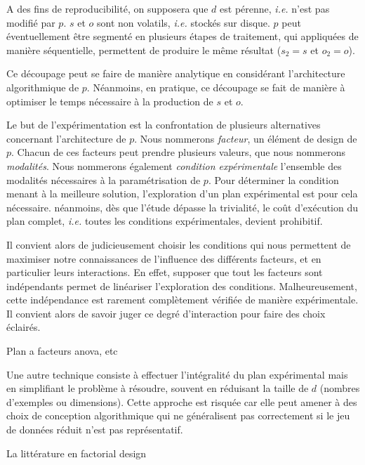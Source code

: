 A des fins de reproducibilité, on supposera que $d$ est pérenne, \textit{i.e.} n'est pas modifié par $p$. $s$ et $o$ sont non volatils, \textit{i.e.} stockés sur disque. $p$ peut éventuellement être segmenté en plusieurs étapes de traitement, qui appliquées de manière séquentielle, permettent de produire le même résultat ($s_2=s$ et $o_2=o$).



Ce découpage peut se faire de manière analytique en considérant l'architecture algorithmique de $p$. Néanmoins, en pratique, ce découpage se fait de manière à optimiser le temps nécessaire à la production de $s$ et $o$.

Le but de l'expérimentation est la confrontation de plusieurs alternatives concernant l'architecture de $p$. Nous nommerons \textsl{facteur}, un élément de design de $p$. Chacun de ces facteurs peut prendre plusieurs valeurs, que nous nommerons \textsl{modalités}. Nous nommerons également \textsl{condition expérimentale} l'ensemble des modalités nécessaires à la  paramétrisation de $p$. Pour déterminer la condition menant à la meilleure solution, l'exploration d'un plan expérimental est pour cela nécessaire. néanmoins, dès que l'étude dépasse la trivialité, le coût d'exécution du plan complet, \textit{i.e.} toutes les conditions expérimentales, devient prohibitif.

Il convient alors de judicieusement choisir les conditions qui nous permettent de maximiser notre connaissances de l'influence des différents facteurs, et en particulier leurs interactions. En effet, supposer que tout les facteurs sont indépendants permet de linéariser l'exploration des conditions. Malheureusement, cette indépendance est rarement complètement vérifiée de manière expérimentale. Il convient alors de savoir juger ce degré d'interaction pour faire des choix éclairés.

Plan a facteurs anova, etc

Une autre technique consiste à effectuer l'intégralité du plan expérimental mais en simplifiant le problème à résoudre, souvent en réduisant la taille de $d$ (nombres d'exemples ou dimensions). Cette approche est risquée car elle peut amener à des choix de conception algorithmique qui ne généralisent pas correctement si le jeu de données réduit n'est pas représentatif.

La littérature en factorial design

